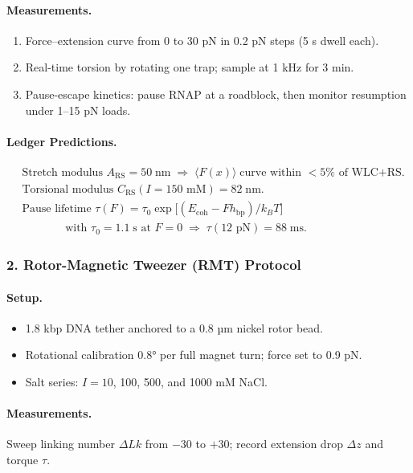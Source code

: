 \documentclass[11pt,oneside]{book}
\begin{document}
\paragraph{Measurements.}
\begin{enumerate}[label=\alph*)]
\item Force–extension curve from 0 to 30 pN in 0.2 pN steps (5 s dwell each).  
\item Real-time torsion by rotating one trap; sample at 1 kHz for 3 min.  
\item Pause-escape kinetics: pause RNAP at a roadblock, then monitor resumption under 1–15 pN loads.
\end{enumerate}

\paragraph{Ledger Predictions.}
\[
\begin{aligned}
&\text{Stretch modulus }A_{\text{RS}} = 50\;\text{nm} \;\Rightarrow\;  
  \bigl\langle F(x)\bigr\rangle\; \text{curve within } <5\% \text{ of WLC+RS}.\\[4pt]
&\text{Torsional modulus }C_{\text{RS}}(I{=}150\!\text{ mM}) = 82\;\text{nm}.\\[4pt]
&\text{Pause lifetime } \tau(F) = \tau_0 \exp\!\bigl[(E_{\text{coh}} - Fh_{\text{bp}})/k_BT\bigr] \\
&\qquad\quad\;\;\; \text{with } \tau_0 = 1.1\;\text{s at }F=0
  \;\Rightarrow\; \tau(12\text{ pN}) = 88\;\text{ms}.
\end{aligned}
\]

\subsubsection*{2. Rotor-Magnetic Tweezer (RMT) Protocol}

\paragraph{Setup.}
\begin{itemize}
\item 1.8 kbp DNA tether anchored to a 0.8 µm nickel rotor bead.  
\item Rotational calibration 0.8° per full magnet turn; force set to 0.9 pN.  
\item Salt series: $I = 10$, 100, 500, and 1000 mM NaCl.
\end{itemize}

\paragraph{Measurements.}
Sweep linking number $\Delta Lk$ from $-30$ to $+30$;
record extension drop $\Delta z$ and torque $\tau$.
\end{document}
